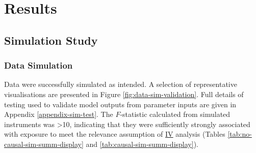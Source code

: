 \documentclass[
]{article}
\begin{document}
\section{Results}\label{results}

\subsection{Simulation Study}\label{simulation-study-1}

\subsubsection{Data Simulation}\label{data-simulation-1}

Data were successfully simulated as intended. A selection of representative visualisations are presented in Figure \ref{fig:data-sim-validation}. Full details of testing used to validate model outputs from parameter inputs are given in Appendix \ref{appendix-sim-test}. The \(F\)-statistic calculated from simulated instruments was \textgreater10, indicating that they were sufficiently strongly associated with exposure to meet the relevance assumption of \hyperref[acronyms_IV]{IV} analysis (Tables \ref{tab:no-causal-sim-summ-display} and \ref{tab:causal-sim-summ-display}).
\end{document}
